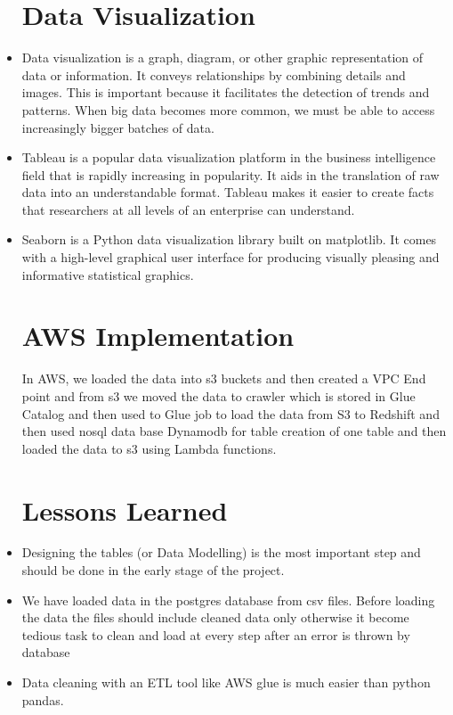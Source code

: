 \documentclass[conference]{IEEEtran}
\begin{document}
\begin{itemize}
\section{Data Visualization}

\item Data visualization is a graph, diagram, or other graphic representation of data or information. It conveys relationships by combining details and images. This is important because it facilitates the detection of trends and patterns. When big data becomes more common, we must be able to access increasingly bigger batches of data.

\item Tableau is a popular data visualization platform in the business intelligence field that is rapidly increasing in popularity. It aids in the translation of raw data into an understandable format. Tableau makes it easier to create facts that researchers at all levels of an enterprise can understand.

\item Seaborn is a Python data visualization library built on matplotlib. It comes with a high-level graphical user interface for producing visually pleasing and informative statistical graphics.





\section{AWS Implementation}
In AWS, we loaded the data into s3 buckets and then created a VPC End point and from s3 we moved the data to crawler which is stored in Glue Catalog and then used to Glue job to load the data from S3 to Redshift and then used nosql data base Dynamodb  for table creation of one table and then loaded the data to s3 using Lambda functions.


\section{Lessons Learned}

\item Designing the tables (or Data Modelling) is the most important step and should be done in the early stage of the project.
\item We have loaded data  in the postgres database from csv files. Before loading the data the files should include cleaned data only otherwise it become tedious task to clean and load at every step after an error is thrown by database
\item Data cleaning with an ETL tool like AWS glue is much easier than python pandas.


\end{itemize}
\end{document}
